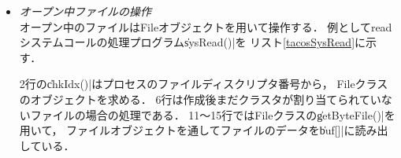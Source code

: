 \begin{itemize}
  2行はクライアントプロセスのPCB中に
  ファイルを記録を残す場所を確保している\footnote{
    プロセス終了時にファイルを自動的にクローズるために，
    プロセス（PCB）に記録を残す必要がある．}．
  4行はfatSysクラスの\|files|配列に場所を確保している．
  7行で\|path|を最後まで解析し目的ファイルのディレクトリエントリを探す．
  見つからない場合はエラーになる\footnote{
    TacOSのopenシステムコールにはファイルの作成機能は無い．
    ファイルの作成はcreatシステムコールで行う．}．
  12行でディレクトリファイルも読み出しオープンを可能にしている．
  14〜18行ではFileオブジェクトとセクタを格納するバッファを生成している．

  

  20〜29行ではFileオブジェクトを初期化している．
  21行ではオープンファイルが
  ディレクトリファイルであることを表すブラグをセットしている．
  26〜27行ではオープンファイルが格納されている
  ディレクトリエントリを記録している\footnote{
    FATファイルシステムでは
    ファイルサイズなどをディレクトリエントリに記録しているので，
    ファイルをオープン後もディレクトリエントリにアクセスする必要がある．}．
  
  33行，35行では，Fileオブジェクトを引数にfileクラスの関数を使用してる．
  {\cmml}で，
  fileクラスのような複数のインスタンスを持つクラスを操作する場合，
  インスタンスを引数にクラスの関数を呼び出す．

  

\item \emph{オープン中ファイルの操作} \\
  オープン中のファイルはFileオブジェクトを用いて操作する．
  例としてreadシステムコールの処理プログラム\|sysRead()|を
  リスト\ref{tacosSysRead}に示す．

  

  2行の\|chkIdx()|はプロセスのファイルディスクリプタ番号から，
  Fileクラスのオブジェクトを求める．
  6行は作成後まだクラスタが割り当てられていないファイルの場合の処理である．
  11〜15行ではFileクラスの\|getByteFile()|を用いて，
  ファイルオブジェクトを通してファイルのデータを\|buf[]|に読み出している．


\end{itemize}

